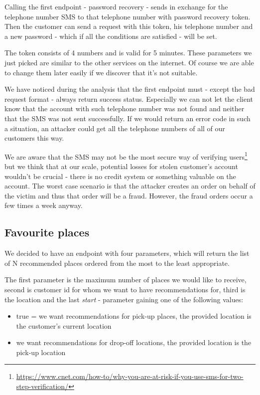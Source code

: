  Calling the first endpoint - password recovery - sends in exchange for the telephone number SMS to that telephone number with password recovery token. Then the customer can send a request with this token, his telephone number and a new password - which if all the conditions are satisfied - will be set. 
 
 The token consists of 4 numbers and is valid for 5 minutes. These parameters we just picked are similar to the other services on the internet. Of course we are able to change them later easily if we discover that it's not suitable.
 
 We have noticed during the analysis that the first endpoint must - except the bad request format - always return success status. Especially we can not let the client know that the account with such telephone number was not found and neither that the SMS was not sent successfully. If we would return an error code in such a situation, an attacker could get all the telephone numbers of all of our customers this way.
 
 We are aware that the SMS may not be the most secure way of verifying users\footnote{\url{https://www.cnet.com/how-to/why-you-are-at-risk-if-you-use-sms-for-two-step-verification/}} but we think that at our scale, potential losses for stolen customer's account wouldn't be crucial - there is no credit system or something valuable on the account. The worst case scenario is that the attacker creates an order on behalf of the victim and thus that order will be a fraud. However, the fraud orders occur a few times a week anyway.
 
 \subsection{Favourite places}
 We decided to have an endpoint with four parameters, which will return the list of N recommended places ordered from the most to the least appropriate.
 
 The first parameter is the maximum number of places we would like to receive, second is customer id for whom we want to have recommendations for, third is the location and the last \textit{start} - parameter gaining one of the following values:
 \begin{itemize}
 	\item true = we want recommendations for pick-up places, the provided location is the customer's current location
 	\item we want recommendations for drop-off locations, the provided location is the pick-up location
 \end{itemize}
 
